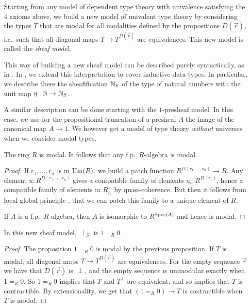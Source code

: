   Starting from any model of dependent type theory with univalence satisfying the 4 axioms above, we build a new
  model of univalent type theory by considering the types $T$ that are modal for all modalities defined by the propositions
  $D(\vec{r})$, i.e.\ such that all diagonal maps $T\rightarrow T^{D(\vec{r})}$ are equivalences.
  This new model is called the \emph{sheaf model}.

    This way of building a new sheaf model can be described purely syntactically, as in \cite{Quirin16}. In \cite{CRS21}, we extend
    this interpretation to cover inductive data types. In particular, we describe there the sheafification $\mathbb{N}_S$ of the type
    of natural numbers with the unit map $\eta:\mathbb{N}\rightarrow\mathbb{N}_S$. 

    A similar description can be done starting with the $1$-presheaf model. In this case, we use for the propositional truncation of a
    presheaf $A$ the image of the canonical map $A\rightarrow 1$. We however get a model of type theory {\em without} universes when we
    consider modal types.

    \begin{proposition}\label{modal}
      The ring $R$ is modal. It follows that any f.p.\ $R$-algebra is modal.
    \end{proposition}

    \begin{proof}
      If $r_1,\dots,r_n$ is in $\mathrm{Um}(R)$, we build a patch function $R^{D(r_1,\dots,r_n)}\rightarrow R$.
      Any element $u:R^{D(r_1,\dots,r_n)}$ gives a compatible family of elements $u_i:R^{D(r_i)}$, hence
      a compatible family of elements in $R_{r_i}$ by quasi-coherence. But then it follows from local-global
      principle \cite{lombardi-quitte}, that we can patch this family to a unique element of $R$.
      
      If $A$ is a f.p.\ $R$-algebra, then $A$ is isomorphic to $R^{\operatorname{Spec}(A)}$ and hence is modal.
    \end{proof}

    \begin{proposition}
      In this new sheaf model, $\perp_S$ is $1 =_R 0$.
    \end{proposition}

    \begin{proof}
      The proposition $1=_R0$ is modal by the previous proposition.
      If $T$ is modal, all diagonal maps $T\rightarrow T^{D(\vec{r})}$ are equivalences. For the empty sequence $\vec{r}$
      we have that $D(\vec{r})$ is $\perp$, and the empty sequence is unimodular exactly when $1 =_R 0$. So $1=_R0$
      implies that $T$ and $T^{\perp}$ are equivalent, and so implies that $T$ is contractible. By extensionality,
      we get that $(1=_R0)\rightarrow T$ is contractible when $T$ is modal.
    \end{proof}
    
